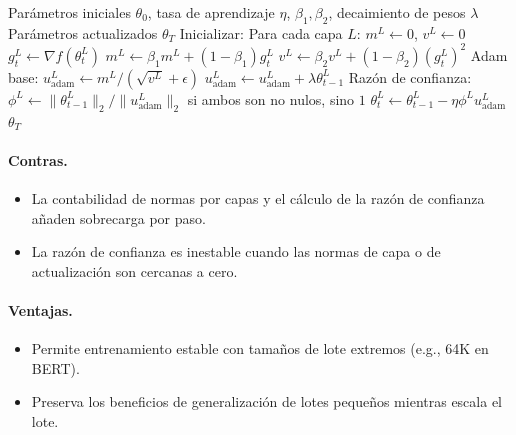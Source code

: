 \begin{algorithm}[H]
\caption{LAMB (Layer-wise Adaptive Moments optimizer for Batch training)}
\label{alg:lamb}
\begin{algorithmic}[1]
\Require Parámetros iniciales $\theta_0$, tasa de aprendizaje $\eta$, $\beta_1, \beta_2$, decaimiento de pesos $\lambda$
\Ensure Parámetros actualizados $\theta_T$
\State Inicializar: Para cada capa $L$: $m^L \gets 0$, $v^L \gets 0$
        \State $g_t^L \gets \nabla f(\theta_t^L)$
        \State $m^L \gets \beta_1 m^L + (1-\beta_1) g_t^L$
        \State $v^L \gets \beta_2 v^L + (1-\beta_2) (g_t^L)^2$
        \State Adam base: $u_{\text{adam}}^L \gets m^L / (\sqrt{v^L} + \epsilon)$
            \State $u_{\text{adam}}^L \gets u_{\text{adam}}^L + \lambda \theta_{t-1}^L$
        \EndIf
        \State Razón de confianza: $\phi^L \gets \|\theta_{t-1}^L\|_2 / \|u_{\text{adam}}^L\|_2$ si ambos son no nulos, sino $1$
        \State $\theta_t^L \gets \theta_{t-1}^L - \eta \phi^L u_{\text{adam}}^L$
    \EndFor
\EndFor
\Return $\theta_T$
\end{algorithmic}
\end{algorithm}

\paragraph{Contras.}
\begin{itemize}[leftmargin=*]
\item La contabilidad de normas por capas y el cálculo de la razón de confianza añaden sobrecarga por paso.
\item La razón de confianza es inestable cuando las normas de capa o de actualización son cercanas a cero.
\end{itemize}

\paragraph{Ventajas.}
\begin{itemize}[leftmargin=*]
\item Permite entrenamiento estable con tamaños de lote extremos (e.g., 64K en BERT).
\item Preserva los beneficios de generalización de lotes pequeños mientras escala el lote.
\end{itemize}

